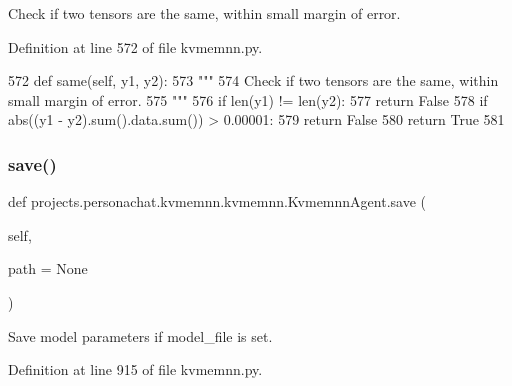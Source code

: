 \begin{DoxyVerb}Check if two tensors are the same, within small margin of error.
\end{DoxyVerb}
 

Definition at line 572 of file kvmemnn.\+py.


\begin{DoxyCode}
572     \textcolor{keyword}{def }same(self, y1, y2):
573         \textcolor{stringliteral}{"""}
574 \textcolor{stringliteral}{        Check if two tensors are the same, within small margin of error.}
575 \textcolor{stringliteral}{        """}
576         \textcolor{keywordflow}{if} len(y1) != len(y2):
577             \textcolor{keywordflow}{return} \textcolor{keyword}{False}
578         \textcolor{keywordflow}{if} abs((y1 - y2).sum().data.sum()) > 0.00001:
579             \textcolor{keywordflow}{return} \textcolor{keyword}{False}
580         \textcolor{keywordflow}{return} \textcolor{keyword}{True}
581 
\end{DoxyCode}
\mbox{\label{classprojects_1_1personachat_1_1kvmemnn_1_1kvmemnn_1_1KvmemnnAgent_a739a619a844360c3bf8a6e6b8879c341}} 
\subsubsection{\texorpdfstring{save()}{save()}}
{\footnotesize\ttfamily def projects.\+personachat.\+kvmemnn.\+kvmemnn.\+Kvmemnn\+Agent.\+save (\begin{DoxyParamCaption}\item[{}]{self,  }\item[{}]{path = {\ttfamily None} }\end{DoxyParamCaption})}

\begin{DoxyVerb}Save model parameters if model_file is set.
\end{DoxyVerb}
 

Definition at line 915 of file kvmemnn.\+py.


